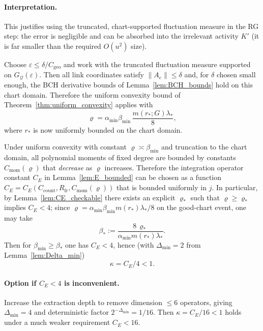 \paragraph{Interpretation.}
This justifies using the truncated, chart-supported fluctuation measure in the RG step:
the error is negligible and can be absorbed into the irrelevant activity $K'$ (it is far smaller than the required $O(u^2)$ size).

\begin{corollary}\label{cor:v84_on_good}
Choose $\varepsilon\le \delta/C_{\mathrm{geo}}$ and work with the truncated fluctuation measure supported on $G_{\mathcal Q}(\varepsilon)$.
Then all link coordinates satisfy $\|A_e\|\le \delta$ and, for $\delta$ chosen small enough, the BCH derivative bounds of Lemma~\ref{lem:BCH_bounds} hold on this chart domain.
Therefore the uniform convexity bound of Theorem~\ref{thm:uniform_convexity} applies with
\[
\varrho=\alpha_{\min}\beta_{\min}\,\frac{m(r_\ast;G)\lambda_\ast}{8},
\]
where $r_\ast$ is now uniformly bounded on the chart domain.
\end{corollary}

\begin{corollary}\label{cor:CE_mech}
Under uniform convexity with constant $\varrho\asymp \beta_{\min}$ and truncation to the chart domain,
all polynomial moments of fixed degree are bounded by constants $C_{\mathrm{mom}}(\varrho)$ that \emph{decrease} as $\varrho$ increases.
Therefore the integration operator constant $C_E$ in Lemma~\ref{lem:E_bounded} can be chosen as a function
$C_E=C_E(C_{\mathrm{count}},R_{\mathrm{fr}},C_{\mathrm{mom}}(\varrho))$ that is bounded uniformly in $j$.
In particular, by Lemma~\ref{lem:CE_checkable} there exists an explicit $\varrho_\ast$ such that $\varrho\ge\varrho_\ast$ implies $C_E<4$; since $\varrho=\alpha_{\min}\beta_{\min} m(r_\ast)\lambda_\ast/8$ on the good-chart event, one may take
\[
\beta_\ast:=\frac{8\,\varrho_\ast}{\alpha_{\min} m(r_\ast)\lambda_\ast}.
\]
Then for $\beta_{\min}\ge \beta_\ast$ one has $C_E<4$, hence (with $\Delta_{\min}=2$ from Lemma~\ref{lem:Delta_min})
\[
\kappa=C_E/4<1.
\]
\end{corollary}

\paragraph{Option if $C_E<4$ is inconvenient.}
Increase the extraction depth to remove dimension $\le 6$ operators, giving $\Delta_{\min}=4$ and deterministic factor $2^{-\Delta_{\min}}=1/16$.
Then $\kappa=C_E/16<1$ holds under a much weaker requirement $C_E<16$.

